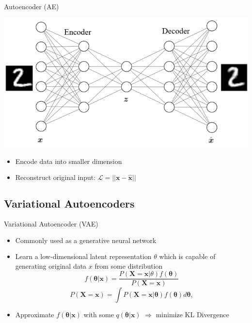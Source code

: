 \documentclass{beamer}
\newcommand{\vect}[1]{\boldsymbol{#1}}
\theoremstyle{definition}
\begin{document}
\begin{frame}{Autoencoder (AE)}
  \begin{center}
    \includegraphics[width=.8\textwidth]{../img/ae_visual.png}
  \end{center}
\begin{itemize}
  \item Encode data into smaller dimension
  \item Reconstruct original input: $\mathcal{L} = ||\vect x - \hat{\vect x}||$
\end{itemize}
\end{frame}

\subsection{Variational Autoencoders}
\begin{frame}{Variational Autoencoder (VAE)}
\begin{itemize}
\item Commonly used as a generative neural network
\item Learn a low-dimensional latent representation $\theta$ which is capable of generating original data $x$ from some distribution
\[
f(\boldsymbol{\theta} | \boldsymbol{x})=\frac{P(\boldsymbol{X}=\boldsymbol{x}| \theta) f(\boldsymbol{\theta})}{P(\boldsymbol{X}=\boldsymbol{x})}
\]
\begin{equation}\label{marginal}
{P(\boldsymbol{X}=\boldsymbol{x})=\int P(\boldsymbol{X}=\boldsymbol{x}| \boldsymbol{\theta}) f(\boldsymbol{\theta})d\boldsymbol{\theta}},\nonumber
\end{equation}
\item<2-> Approximate $f(\boldsymbol{\theta} | \boldsymbol{x})$ with some $q(\boldsymbol{\theta} | \boldsymbol{x})$ $\Rightarrow$ minimize KL Divergence
\end{itemize}
\end{frame}
\end{document}
